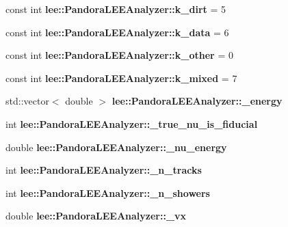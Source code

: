 \begin{DoxyCompactItemize}
\item 
\hypertarget{group__lee_gafa596ee5d7a68568ce5371f17c38ee96}{const int {\bfseries lee\-::\-Pandora\-L\-E\-E\-Analyzer\-::k\-\_\-dirt} = 5}\label{group__lee_gafa596ee5d7a68568ce5371f17c38ee96}

\item 
\hypertarget{group__lee_ga00720d429d223c6bfd351b500b287517}{const int {\bfseries lee\-::\-Pandora\-L\-E\-E\-Analyzer\-::k\-\_\-data} = 6}\label{group__lee_ga00720d429d223c6bfd351b500b287517}

\item 
\hypertarget{group__lee_ga397f9459c5ff25721ca99fa9b9df4880}{const int {\bfseries lee\-::\-Pandora\-L\-E\-E\-Analyzer\-::k\-\_\-other} = 0}\label{group__lee_ga397f9459c5ff25721ca99fa9b9df4880}

\item 
\hypertarget{group__lee_ga75e327e4124da9ee9a1a95a4126be377}{const int {\bfseries lee\-::\-Pandora\-L\-E\-E\-Analyzer\-::k\-\_\-mixed} = 7}\label{group__lee_ga75e327e4124da9ee9a1a95a4126be377}

\item 
\hypertarget{group__lee_gaf64e85c1a6351ba43d787ae01d82f34e}{std\-::vector$<$ double $>$ {\bfseries lee\-::\-Pandora\-L\-E\-E\-Analyzer\-::\-\_\-energy}}\label{group__lee_gaf64e85c1a6351ba43d787ae01d82f34e}

\item 
\hypertarget{group__lee_ga0fb26f882cca04dd6e9d6162808365c8}{int {\bfseries lee\-::\-Pandora\-L\-E\-E\-Analyzer\-::\-\_\-true\-\_\-nu\-\_\-is\-\_\-fiducial}}\label{group__lee_ga0fb26f882cca04dd6e9d6162808365c8}

\item 
\hypertarget{group__lee_ga23ee0dccbe8495fa418cb6c0020c1643}{double {\bfseries lee\-::\-Pandora\-L\-E\-E\-Analyzer\-::\-\_\-nu\-\_\-energy}}\label{group__lee_ga23ee0dccbe8495fa418cb6c0020c1643}

\item 
\hypertarget{group__lee_ga023bb8e8a12ac261583b6d71fd1c12e2}{int {\bfseries lee\-::\-Pandora\-L\-E\-E\-Analyzer\-::\-\_\-n\-\_\-tracks}}\label{group__lee_ga023bb8e8a12ac261583b6d71fd1c12e2}

\item 
\hypertarget{group__lee_ga18da3a91fd8778add6fbd0c4e2244f89}{int {\bfseries lee\-::\-Pandora\-L\-E\-E\-Analyzer\-::\-\_\-n\-\_\-showers}}\label{group__lee_ga18da3a91fd8778add6fbd0c4e2244f89}

\item 
\hypertarget{group__lee_ga440e3b5b58670672f25f42dd09d0aa21}{double {\bfseries lee\-::\-Pandora\-L\-E\-E\-Analyzer\-::\-\_\-vx}}\label{group__lee_ga440e3b5b58670672f25f42dd09d0aa21}


\end{DoxyCompactItemize}
